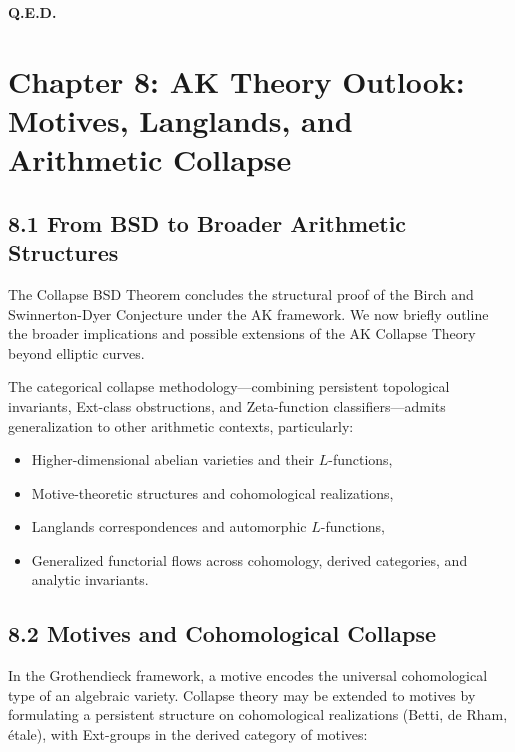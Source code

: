 \documentclass[11pt]{article}
\begin{document}
\begin{flushright}
\textbf{Q.E.D.}
\end{flushright}




\section{Chapter 8: AK Theory Outlook: Motives, Langlands, and Arithmetic Collapse}

\subsection{8.1 From BSD to Broader Arithmetic Structures}

The Collapse BSD Theorem concludes the structural proof of the Birch and Swinnerton-Dyer Conjecture under the AK framework.  
We now briefly outline the broader implications and possible extensions of the AK Collapse Theory beyond elliptic curves.

The categorical collapse methodology—combining persistent topological invariants, Ext-class obstructions, and Zeta-function classifiers—admits generalization to other arithmetic contexts, particularly:

\begin{itemize}
  \item Higher-dimensional abelian varieties and their $L$-functions,
  \item Motive-theoretic structures and cohomological realizations,
  \item Langlands correspondences and automorphic $L$-functions,
  \item Generalized functorial flows across cohomology, derived categories, and analytic invariants.
\end{itemize}

\subsection{8.2 Motives and Cohomological Collapse}

In the Grothendieck framework, a motive encodes the universal cohomological type of an algebraic variety.  
Collapse theory may be extended to motives by formulating a persistent structure on cohomological realizations (Betti, de Rham, étale), with Ext-groups in the derived category of motives:
\end{document}
